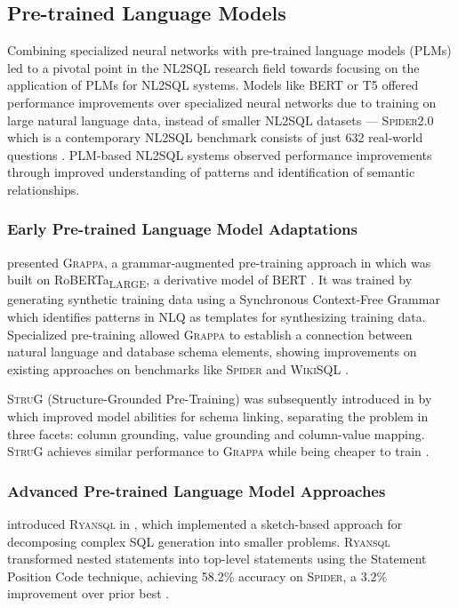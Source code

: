 \subsection{Pre-trained Language Models}

Combining specialized neural networks with pre-trained language models (PLMs)
led to a pivotal point in the NL2SQL research field towards focusing on the
application of PLMs for NL2SQL systems. Models like BERT or T5 offered
performance improvements over specialized neural networks due to training on
large natural language data, instead of smaller NL2SQL datasets —
\textsc{Spider2.0} which is a contemporary NL2SQL benchmark consists of just
632 real-world questions \citep{Spider2}. PLM-based NL2SQL systems observed
performance improvements through improved understanding of patterns and
identification of semantic relationships.

\subsubsection{Early Pre-trained Language Model Adaptations}

\citeauthor{Grappa} presented \textsc{Grappa}, a grammar-augmented pre-training
approach in \citeyear{GRAPPA} which was built on
RoBERTa\textsubscript{\tiny{LARGE}}, a derivative model of BERT
\citep{GRAPPA}. It was trained by generating synthetic training data using a
Synchronous Context-Free Grammar which identifies patterns in NLQ as templates
for synthesizing training data. Specialized pre-training allowed
\textsc{Grappa} to establish a connection between natural language and database
schema elements, showing improvements on existing approaches on benchmarks like
\textsc{Spider} and \textsc{WikiSQL} \citep{GRAPPA}.

\textsc{StruG} (Structure-Grounded Pre-Training) was subsequently introduced in
\citeyear{STRUG} by \citeauthor*{STRUG} which improved model abilities for
schema linking, separating the problem in three facets: column grounding, value
grounding and column-value mapping. \textsc{StruG} achieves similar performance
to \textsc{Grappa} while being cheaper to train \citep{STRUG}.

\subsubsection{Advanced Pre-trained Language Model Approaches}

\citeauthor*{RYANSQL} introduced \textsc{Ryansql} in \citeyear{RYANSQL}, which
implemented a sketch-based approach for decomposing complex SQL generation into
smaller problems. \textsc{Ryansql} transformed nested statements into top-level
statements using the Statement Position Code technique, achieving 58.2\%
accuracy on \textsc{Spider}, a 3.2\% improvement over prior best
\citep{RYANSQL}. 

